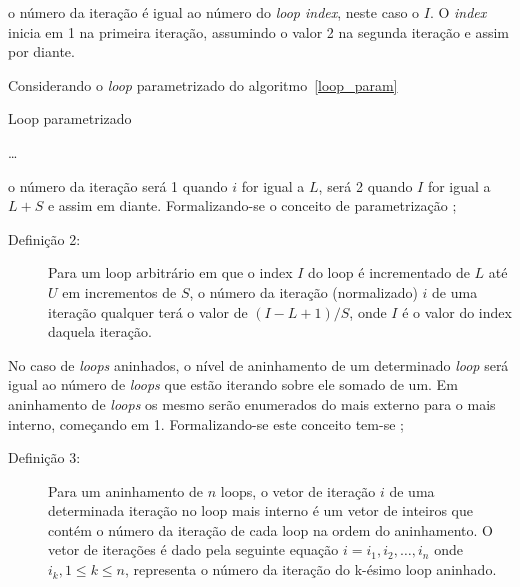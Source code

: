o número da iteração é igual ao número do \textit{loop index}, neste caso o $I$.
O \textit{index} inicia em 1 na primeira iteração, assumindo o valor 2 na
segunda iteração e assim por diante.

Considerando o \textit{loop} parametrizado do algoritmo~\ref{loop_param}

\begin{algorithm}
        \caption{Loop parametrizado}
        \label{loop_param}
        \begin{algorithmic}[1]
                \STATE \ldots
                \ENDFOR
        \end{algorithmic}
\end{algorithm}

o número da iteração será 1 quando $i$ for igual a $L$, será 2 quando $I$ for
igual a $L+S$ e assim em diante. 
Formalizando-se o conceito de parametrização \cite[2.2]{ocfma};

\begin{description}
        \item [Definição 2:] Para um loop arbitrário em que o index $I$ do loop é
        incrementado de $L$ até $U$ em incrementos de $S$, o número da iteração
        (normalizado) $i$ de uma iteração qualquer terá o valor de 
        $(I - L + 1)/ S$, onde $I$ é o valor do index daquela iteração.
\end{description}

No caso de \textit{loops} aninhados, o nível de aninhamento de um determinado 
\textit{loop} será igual ao número de \textit{loops} que estão iterando sobre
ele somado de um. Em aninhamento de \textit{loops} os mesmo serão enumerados do
mais externo para o mais interno, começando em 1. Formalizando-se este conceito
tem-se \cite[2.2]{ocfma};

\begin{description}
        \item[Definição 3:] Para um aninhamento de $n$ loops, o vetor de
                iteração $i$ de uma determinada iteração no loop mais interno 
                é um vetor de inteiros que contém o número da iteração de cada 
                loop na ordem do aninhamento. 
                O vetor de iterações é dado pela seguinte equação
                $i = {i_1, i_2, \ldots, i_n}$
                onde $i_k, 1 \leq k \leq n$, representa o número da iteração do 
                k-ésimo loop aninhado.
\end{description}

